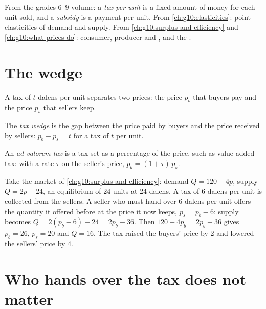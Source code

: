 \begin{recall}
From the grades 6--9 volume: a \emph{tax per unit} is a fixed amount of money for each unit sold, and a \emph{subsidy} is a payment per unit. From
\cref{ch:g10:elasticities}: point elasticities of demand and supply. From \cref{ch:g10:surplus-and-efficiency} and \cref{ch:g10:what-prices-do}:
consumer, producer and , and the .
\end{recall}

\section{The wedge}\label{sec:g10:tax-incidence:wedge}

A tax of $t$ dalens per unit separates two prices: the price $p_b$ that buyers pay and the price $p_s$ that sellers keep.

\begin{definition}\label{def:g10:tax-incidence:wedge}
The \emph{tax wedge} is the gap between the price paid by buyers and the price received by sellers: $p_b - p_s = t$ for a tax of $t$
per unit.
\end{definition}

\begin{definition}\label{def:g10:tax-incidence:ad-valorem}
An \emph{ad valorem tax} is a tax set as a percentage of the price, such as value added tax: with a rate $\tau$ on the seller's
price, $p_b = (1 + \tau)\,p_s$.
\end{definition}

Take the market of \cref{ch:g10:surplus-and-efficiency}: demand $Q = 120 - 4p$, supply $Q = 2p - 24$, an equilibrium of 24 units at 24 dalens. A tax of 6
dalens per unit is collected from the sellers. A seller who must hand over 6 dalens per unit offers the quantity it offered before at the price it now
keeps, $p_s = p_b - 6$: supply becomes $Q = 2(p_b - 6) - 24 = 2p_b - 36$. Then $120 - 4p_b = 2p_b - 36$ gives $p_b = 26$, $p_s = 20$ and $Q = 16$. The tax
raised the buyers' price by 2 and lowered the sellers' price by 4.

\section{Who hands over the tax does not matter}\label{sec:g10:tax-incidence:statutory}

